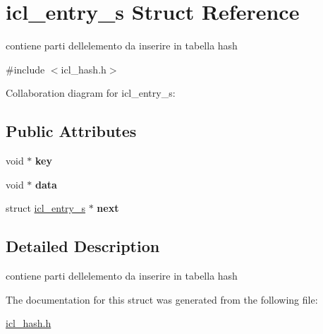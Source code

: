 \hypertarget{structicl__entry__s}{}\section{icl\+\_\+entry\+\_\+s Struct Reference}
\label{structicl__entry__s}


contiene parti dell\textquotesingle{}elemento da inserire in tabella hash  




{\ttfamily \#include $<$icl\+\_\+hash.\+h$>$}



Collaboration diagram for icl\+\_\+entry\+\_\+s\+:
\subsection*{Public Attributes}
\begin{DoxyCompactItemize}
\item 
void $\ast$ {\bfseries key}\hypertarget{structicl__entry__s_a175ddfefe49a8f6fa16155e58c39c88e}{}\label{structicl__entry__s_a175ddfefe49a8f6fa16155e58c39c88e}

\item 
void $\ast$ {\bfseries data}\hypertarget{structicl__entry__s_ac01964f2d85fcdbaa2d16c78fb1a99d6}{}\label{structicl__entry__s_ac01964f2d85fcdbaa2d16c78fb1a99d6}

\item 
struct \hyperlink{structicl__entry__s}{icl\+\_\+entry\+\_\+s} $\ast$ {\bfseries next}\hypertarget{structicl__entry__s_af5bc67953f51e75cf74066d616f3420c}{}\label{structicl__entry__s_af5bc67953f51e75cf74066d616f3420c}

\end{DoxyCompactItemize}


\subsection{Detailed Description}
contiene parti dell\textquotesingle{}elemento da inserire in tabella hash 

The documentation for this struct was generated from the following file\+:\begin{DoxyCompactItemize}
\item 
\hyperlink{icl__hash_8h}{icl\+\_\+hash.\+h}\end{DoxyCompactItemize}
